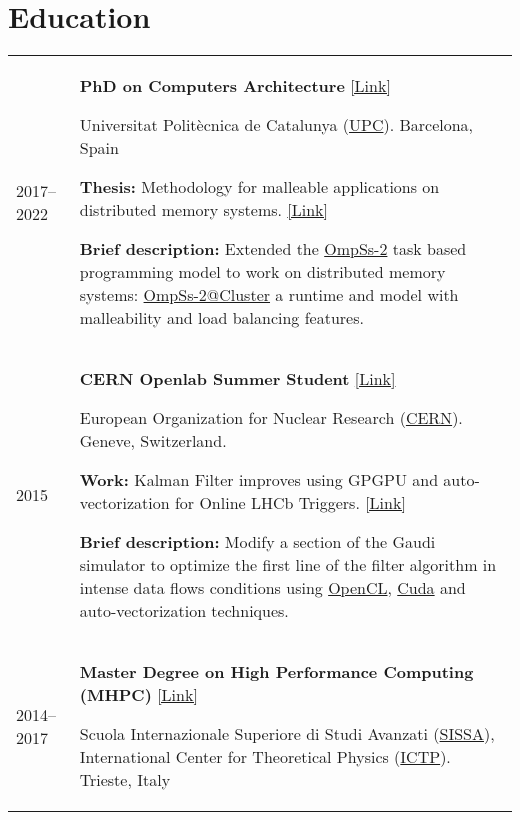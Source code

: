 \documentclass[a4paper,10pt]{article}
\begin{document}
\section{Education}
\begin{tabularx}{\linewidth}{@{}l X@{}}
  2017--2022 & \textbf{PhD on Computers Architecture}
               \href{https://www.ac.upc.edu/en/academics/ph-d/ph-d-programme-by-computer-architecture}{[Link]}

               Universitat Polit\`ecnica de Catalunya (\href{https://www.upc.edu/en}{UPC}).
               Barcelona, Spain

               \textbf{Thesis:} Methodology for malleable applications on distributed memory systems.
               \href{http://paul-carpenter.org/aguilar2022thesis.pdf}{[Link]}

               \textbf{Brief description:} Extended the \href{https://pm.bsc.es/ompss-2}{OmpSs-2} task based programming model to
               work on distributed memory systems: \href{https://github.com/bsc-pm/ompss-2-cluster-releases}{OmpSs-2@Cluster}
               a runtime and model with malleability and load balancing features.
  \\

  2015 & \textbf{CERN Openlab Summer Student} \href{https://home.cern/science/computing/cern-openlab}{[Link]}

         European Organization for Nuclear Research (\href{https://home.cern/}{CERN}).
         Geneve, Switzerland.

         \textbf{Work:} Kalman Filter improves using GPGPU and auto-vectorization for Online LHCb Triggers.
         \href{https://zenodo.org/record/31869}{[Link]}

         \textbf{Brief description:} Modify a section of the Gaudi simulator to optimize the first line
         of the filter algorithm in intense data flows conditions using \href{https://www.khronos.org/opencl/}{OpenCL},
         \href{https://developer.nvidia.com/cuda-zone}{Cuda} and auto-vectorization techniques.
  \\

  2014--2017 & \textbf{Master Degree on High Performance Computing (MHPC)} \href{http://www.mhpc.it}{[Link]}

               Scuola Internazionale Superiore di Studi Avanzati (\href{https://www.sissa.it/}{SISSA}),
               International Center for Theoretical Physics (\href{https://www.ictp.it/}{ICTP}).
               Trieste, Italy


\end{tabularx}
\end{document}

